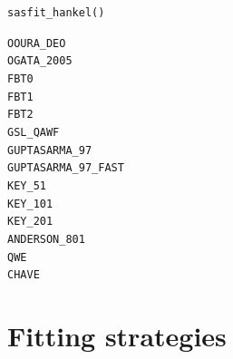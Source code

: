  \texttt{sasfit\_hankel()} \cite{Chave1983,Anderson1989,Ooura_1991,Guptasarma1997,Ogata2005,Kong2007,Key2012,Kang2021}
\begin{description} 
\item[\texttt{OOURA\_DEO}]
\item[\texttt{OGATA\_2005}]
\item[\texttt{FBT0}]
\item[\texttt{FBT1}]
\item[\texttt{FBT2}]
\item[\texttt{GSL\_QAWF}]
\item[\texttt{GUPTASARMA\_97}]
\item[\texttt{GUPTASARMA\_97\_FAST}]
\item[\texttt{KEY\_51}]
\item[\texttt{KEY\_101}]
\item[\texttt{KEY\_201}]
\item[\texttt{ANDERSON\_801}]
\item[\texttt{QWE}]
\item[\texttt{CHAVE}]
\end{description}

\clearpage
\section{Fitting strategies}
